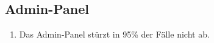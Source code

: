 \subsection{Admin-Panel}

\begin{enumerate}
    \item Das Admin-Panel stürzt in 95\% der Fälle nicht ab.
\end{enumerate}